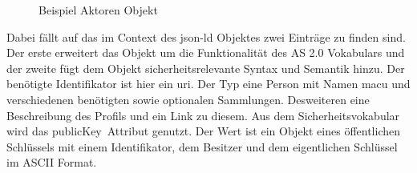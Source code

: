 {\begin{figure}[h]
\begin{minipage}{\textwidth}
			\label{fig:actor}
			\caption{Beispiel Aktoren Objekt}
		\end{minipage}
	\end{figure}
	Dabei fällt auf das im Context des \gls{json-ld} Objektes zwei Einträge zu finden sind. Der erste erweitert das Objekt um die Funktionalität des AS 2.0 Vokabulars und der zweite fügt dem Objekt sicherheitsrelevante Syntax und Semantik hinzu. Der benötigte Identifikator ist hier ein \gls{uri}. Der Typ eine Person mit Namen macu und verschiedenen benötigten sowie optionalen Sammlungen. Desweiteren eine Beschreibung des Profils und ein Link zu diesem. Aus dem Sicherheitsvokabular wird das \glqq publicKey\grqq~Attribut genutzt. Der Wert ist ein Objekt eines öffentlichen Schlüssels mit einem Identifikator, dem Besitzer und dem eigentlichen Schlüssel im ASCII Format.
}
\subsection{
}
